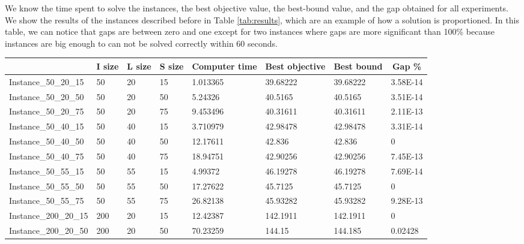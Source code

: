 We know the time spent to solve the instances, the best objective value, the best-bound value, and the gap obtained for all experiments. We show the results of the instances described before in Table \ref{tab:results}, which are an example of how a solution is proportioned. In this table, we can notice that gaps are between zero and one except for two instances where gaps are more significant than 100\% because instances are big enough to can not be solved correctly within 60 seconds. 

\begin{table}[]
\centering 
\small\addtolength{\tabcolsep}{-5pt}
\begin{tabular}{|l|l|l|l|l|l|l|l|}
\hline
\rowcolor[HTML]{CBCEFB} 
\multicolumn{1}{|c|}{\cellcolor[HTML]{CBCEFB}Instance name} &
  \multicolumn{1}{c|}{\cellcolor[HTML]{CBCEFB}I size} &
  \multicolumn{1}{c|}{\cellcolor[HTML]{CBCEFB}L size} &
  \multicolumn{1}{c|}{\cellcolor[HTML]{CBCEFB}S size} &
  \multicolumn{1}{c|}{\cellcolor[HTML]{CBCEFB}Computer time} &
  \multicolumn{1}{c|}{\cellcolor[HTML]{CBCEFB}Best objective} &
  \multicolumn{1}{c|}{\cellcolor[HTML]{CBCEFB}Best bound} &
  \multicolumn{1}{c|}{\cellcolor[HTML]{CBCEFB}Gap \%} \\ \hline
Instance\_50\_20\_15  & 50  & 20 & 15 & 1.013365 & 39.68222 & 39.68222 & 3.58E-14 \\ \hline
Instance\_50\_20\_50  & 50  & 20 & 50 & 5.24326  & 40.5165  & 40.5165  & 3.51E-14 \\ \hline
Instance\_50\_20\_75  & 50  & 20 & 75 & 9.453496 & 40.31611 & 40.31611 & 2.11E-13 \\ \hline
Instance\_50\_40\_15  & 50  & 40 & 15 & 3.710979 & 42.98478 & 42.98478 & 3.31E-14 \\ \hline
Instance\_50\_40\_50  & 50  & 40 & 50 & 12.17611 & 42.836   & 42.836   & 0        \\ \hline
Instance\_50\_40\_75  & 50  & 40 & 75 & 18.94751 & 42.90256 & 42.90256 & 7.45E-13 \\ \hline
Instance\_50\_55\_15  & 50  & 55 & 15 & 4.99372  & 46.19278 & 46.19278 & 7.69E-14 \\ \hline
Instance\_50\_55\_50  & 50  & 55 & 50 & 17.27622 & 45.7125  & 45.7125  & 0        \\ \hline
Instance\_50\_55\_75  & 50  & 55 & 75 & 26.82138 & 45.93282 & 45.93282 & 9.28E-13 \\ \hline
Instance\_200\_20\_15 & 200 & 20 & 15 & 12.42387 & 142.1911 & 142.1911 & 0        \\ \hline
Instance\_200\_20\_50 & 200 & 20 & 50 & 70.23259 & 144.15   & 144.185  & 0.02428  \\ \hline

\end{tabular}
\end{table}

